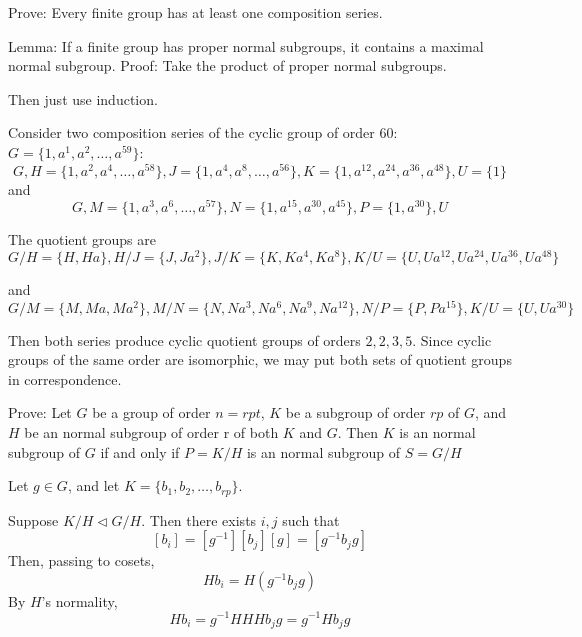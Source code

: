\exercise
Prove: Every finite group has at least one composition series.

\answer
Lemma: If a finite group has proper normal subgroups, it contains a maximal normal subgroup. Proof: Take the product of proper normal subgroups.

Then just use induction.


\exercise
Consider two composition series of the cyclic group of order $60$: $G = \{1, a^1, a^2, \ldots, a^{59}\}$:
\[G, 
H = \{1,a^2, a^4, \ldots, a^{58}\}, 
J=\{1, a^4, a^8, \ldots, a^{56}\}, 
K = \{1, a^{12}, a^{24}, a^{36}, a^{48}\}, 
U = \{1\}\]
and
\[G,
    M = \{1, a^3, a^6, \ldots, a^{57}\},
N = \{1, a^{15}, a^{30}, a^{45}\},
P = \{1, a^{30}\},
U\]

\answer
The quotient groups are 
\[G/H = \{H, Ha\},
H/J = \{J, Ja^2\},
J/K = \{K, Ka^4, Ka^8\},
K/U = \{U, Ua^{12}, Ua^{24}, Ua^{36}, Ua^{48}\}\]

and
\[G/M = \{M, Ma, Ma^2\},
M/N = \{N, Na^3, Na^6, Na^9, Na^{12}\},
N/P = \{P, Pa^{15}\},
K/U = \{U, Ua^{30}\}\]

Then both series produce cyclic quotient groups of orders $2, 2, 3, 5$. Since cyclic groups of the same order are isomorphic, we may put both sets of quotient groups in correspondence.


\exercise
Prove: Let $G$ be a group of order $n = rpt$, $K$ be a subgroup of order $rp$ of $G$, and $H$ be an normal subgroup of order r of both $K$ and $G$. Then $K$ is an normal subgroup of $G$ if and only if $P = K/H$ is an normal subgroup of $S = G/H$

\answer
Let $g \in G$, and let $K = \{b_1, b_2, \ldots, b_{rp}\}$.

Suppose $K/H \triangleleft G/H$. Then there exists $i, j$ such that
\[[b_i] = [g^{-1}][b_j][g] = [g^{-1}b_jg]\]
Then, passing to cosets,
\[Hb_i = H(g^{-1}b_jg)\]
By $H$'s normality,
\[Hb_i = g^{-1}HHHb_jg = g^{-1}Hb_jg\]

